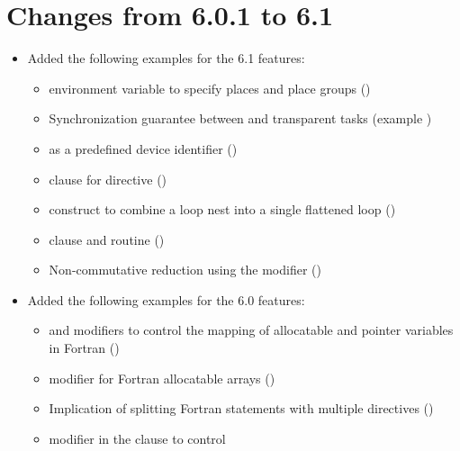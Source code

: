 \label{chap:history}

\section{Changes from 6.0.1 to 6.1}
\label{sec:history_601_to_61}

\begin{itemize}
\item Added the following examples for the 6.1 features:
\begin{itemize}
  \item {} environment variable to specify places and
    place groups
    ()
  \item Synchronization guarantee between  and
    transparent tasks (example  
    )
  \item {} as a predefined device identifier
    ()
  \item {} clause for  directive
    ()
  \item {} construct to combine a loop nest into a single
    flattened loop ()
  \item {} clause and
     routine
    ()
  \item Non-commutative reduction using the  modifier
    ()
\end{itemize}
\item Added the following examples for the 6.0 features:
\begin{itemize}
  \item {} and  modifiers to control
    the mapping of allocatable and pointer variables in Fortran
    ()
  \item {} modifier for Fortran allocatable arrays
    ()
  \item Implication of splitting Fortran statements with multiple
     directives
    ()
  \item {} modifier in the  clause to control

\end{itemize}
\end{itemize}
